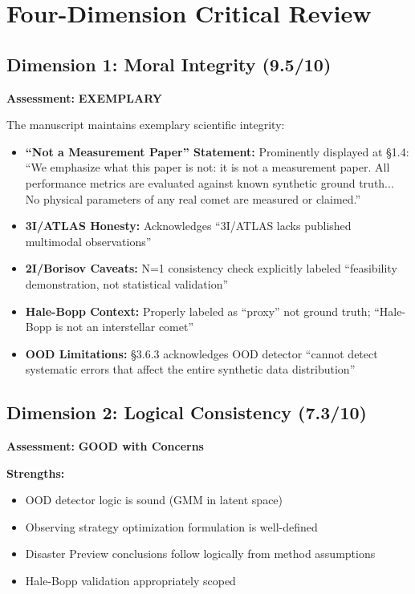 \documentclass[12pt,a4paper]{article}
\newcommand{\good}[1]{\textcolor{GoodGreen}{\textbf{#1}}}
\newcommand{\excellent}[1]{\textcolor{ExcellentGreen}{\textbf{#1}}}
\begin{document}
\section{Four-Dimension Critical Review}

\subsection{Dimension 1: Moral Integrity (9.5/10)}

\textbf{Assessment:} \excellent{EXEMPLARY}

The manuscript maintains exemplary scientific integrity:

\begin{itemize}
\item \excellent{``Not a Measurement Paper'' Statement:} Prominently displayed at \S1.4: ``We emphasize what this paper is not: it is not a measurement paper. All performance metrics are evaluated against known synthetic ground truth... No physical parameters of any real comet are measured or claimed.''
\item \good{3I/ATLAS Honesty:} Acknowledges ``3I/ATLAS lacks published multimodal observations''
\item \good{2I/Borisov Caveats:} N=1 consistency check explicitly labeled ``feasibility demonstration, not statistical validation''
\item \good{Hale-Bopp Context:} Properly labeled as ``proxy'' not ground truth; ``Hale-Bopp is not an interstellar comet''
\item \good{OOD Limitations:} \S3.6.3 acknowledges OOD detector ``cannot detect systematic errors that affect the entire synthetic data distribution''
\end{itemize}

\subsection{Dimension 2: Logical Consistency (7.3/10)}

\textbf{Assessment:} \good{GOOD with Concerns}

\textbf{Strengths:}
\begin{itemize}
\item OOD detector logic is sound (GMM in latent space)
\item Observing strategy optimization formulation is well-defined
\item Disaster Preview conclusions follow logically from method assumptions
\item Hale-Bopp validation appropriately scoped
\end{itemize}
\end{document}
